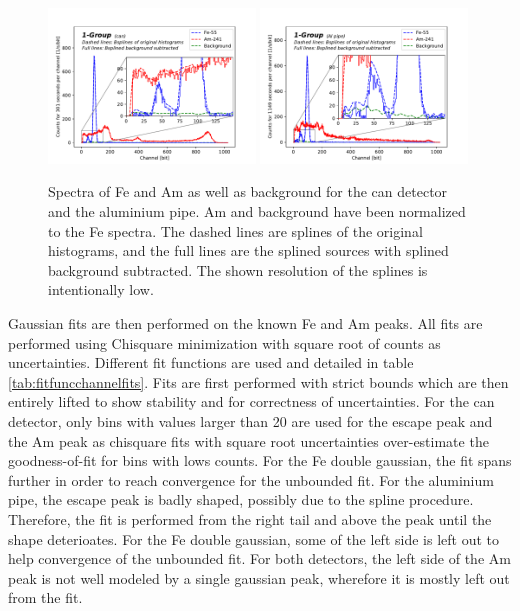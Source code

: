 \begin{figure}[htb]
  \includegraphics[width=0.49\textwidth,page=1]{graphics/bkgsubtraction.pdf}
  \includegraphics[width=0.49\textwidth,page=1]{graphics/alubkgsubtraction.pdf}
  \caption{Spectra of Fe and Am as well as background for the can detector and the aluminium pipe. Am and background have been normalized to the Fe spectra. The dashed lines are splines of the original histograms, and the full lines are the splined sources with splined background subtracted. The shown resolution of the splines is intentionally low.}
  \label{fig:spectra}
\end{figure}

Gaussian fits are then performed on the known Fe and Am peaks. All fits are performed using Chisquare minimization with square root of counts as uncertainties. Different fit functions are used and detailed in table \ref{tab:fitfuncchannelfits}. Fits are first performed with strict bounds which are then entirely lifted to show stability and for correctness of uncertainties. For the can detector, only bins with values larger than 20 are used for the escape peak and the Am peak as chisquare fits with square root uncertainties over-estimate the goodness-of-fit for bins with lows counts. For the Fe double gaussian, the fit spans further in order to reach convergence for the unbounded fit. For the aluminium pipe, the escape peak is badly shaped, possibly due to the spline procedure. Therefore, the fit is performed from the right tail and above the peak until the shape deterioates. For the Fe double gaussian, some of the left side is left out to help convergence of the unbounded fit. For both detectors, the left side of the Am peak is not well modeled by a single gaussian peak, wherefore it is mostly left out from the fit.

